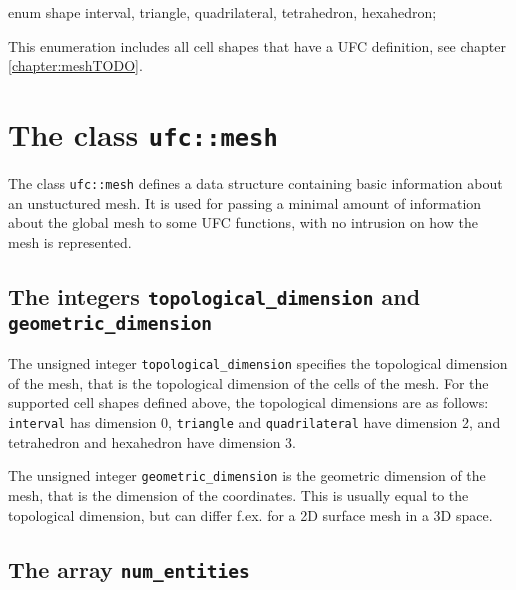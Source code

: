\begin{code}
enum shape {interval,
            triangle, quadrilateral,
            tetrahedron, hexahedron};
\end{code}

This enumeration includes all cell shapes that have a UFC definition, see chapter \ref{chapter:meshTODO}.


\section{The class \texttt{ufc::mesh}}

The class \texttt{ufc::mesh} defines a data structure containing basic information about
an unstuctured mesh. It is used for passing a minimal amount of information about the
global mesh to some UFC functions, with no intrusion on how the mesh is represented.

\subsection{The integers \texttt{topological\_dimension} and \texttt{geometric\_dimension}}


The unsigned integer \texttt{topological\_dimension}
specifies the topological dimension of the mesh, that is the
topological dimension of the cells of the mesh. For the supported
cell shapes defined above, the topological dimensions are as follows:
\texttt{interval} has dimension 0, \texttt{triangle} and
\texttt{quadrilateral} have dimension 2, and tetrahedron and
hexahedron have dimension 3.


The unsigned integer \texttt{geometric\_dimension} is the geometric dimension
of the mesh, that is the dimension of the coordinates.
This is usually equal to the topological dimension, but can differ f.ex. for
a 2D surface mesh in a 3D space.

\subsection{The array \texttt{num\_entities}}

